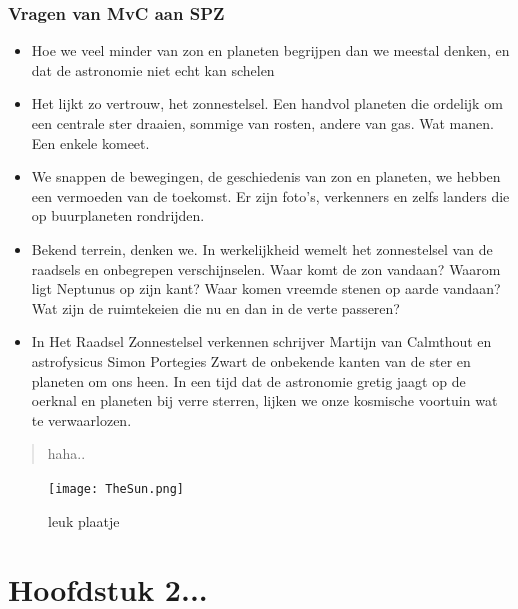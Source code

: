 \documentclass[11pt,fleqn]{book} %
\begin{document}
\subsection{Vragen van MvC aan SPZ}

\begin{itemize}
  \item Hoe we veel minder van zon en planeten begrijpen dan we meestal denken, en dat de astronomie niet echt kan schelen

  \item   Het lijkt zo vertrouw, het zonnestelsel. Een handvol planeten die ordelijk om een centrale ster draaien, sommige van rosten, andere van gas. Wat manen. Een enkele komeet.

  \item   We snappen de bewegingen, de geschiedenis van zon en planeten, we hebben een vermoeden van de toekomst. Er zijn foto’s, verkenners en zelfs landers die op buurplaneten rondrijden.

  \item   Bekend terrein, denken we. In werkelijkheid wemelt het zonnestelsel van de raadsels en onbegrepen verschijnselen. Waar komt de zon vandaan? Waarom ligt Neptunus op zijn kant? Waar komen vreemde stenen op aarde vandaan? Wat zijn de ruimtekeien die nu en dan in de verte passeren?

  \item   In Het Raadsel Zonnestelsel verkennen schrijver Martijn van Calmthout en astrofysicus Simon Portegies Zwart de onbekende kanten van de ster en planeten om ons heen. In een tijd dat de astronomie gretig jaagt op de oerknal en planeten bij verre sterren, lijken we onze kosmische voortuin wat te verwaarlozen.
\end{itemize}
  

\begin{quote}
haha..
\end{quote}

\begin{figure}[h]
    \centering
    \texttt{[image: TheSun.png]}
    \caption{leuk plaatje}
    \label{fig:pca}
\end{figure}




\chapter{Hoofdstuk 2...}
\end{document}
